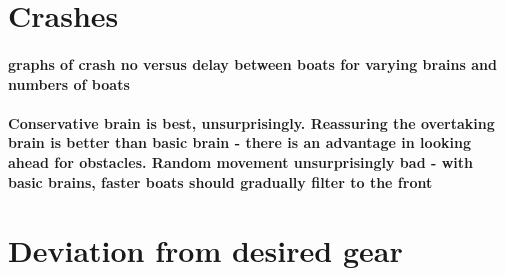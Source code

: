 \section{Crashes}
  \paragraph{graphs of crash no versus delay between boats for varying brains and numbers of boats}
  
  \paragraph{Conservative brain is best, unsurprisingly. Reassuring the overtaking brain is better than basic brain - there is an advantage in looking ahead for obstacles. Random movement unsurprisingly bad - with basic brains, faster boats should gradually filter to the front}
  
\section{Deviation from desired gear}
